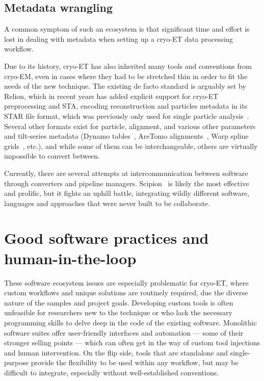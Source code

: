 \subsection{Metadata wrangling}

A common symptom of such an ecosystem is that significant time and effort is lost in dealing with metadata when setting up a cryo-ET data processing workflow.

Due to its history, cryo-ET has also inherited many tools and conventions from cryo-EM, even in cases where they had to be stretched thin in order to fit the needs of the new technique.
The existing de facto standard is arguably set by Relion, which in recent years has added explicit support for cryo-ET preprocessing and STA, encoding reconstruction and particles metadata in its STAR file format, which was previously only used for single particle analysis~\cite{zivanovBayesianApproachSingleparticle2022,burtImageProcessingPipeline2024}.
Several other formats exist for particle, alignment, and various other parameters and tilt-series metadata (Dynamo tables~\cite{castano-diezDynamoCatalogueGeometrical2017}, AreTomo alignments~\cite{zhengAreTomoIntegratedSoftware2022}, Warp spline grids~\cite{tegunovRealtimeCryoelectronMicroscopy2019}, etc.), and while some of them can be interchangeable, others are virtually impossible to convert between.

Currently, there are several attempts at intercommunication between software through converters and pipeline managers.
Scipion~\cite{delarosa-trevinScipionSoftwareFramework2016} is likely the most effective and prolific, but it fights an uphill battle, integrating wildly different software, languages and approaches that were never built to be collaborate.


\section{Good software practices and human-in-the-loop}

These software ecosystem issues are especially problematic for cryo-ET, where custom workflows and unique solutions are routinely required, due the diverse nature of the samples and project goals.
Developing custom tools is often unfeasible for researchers new to the technique or who lack the necessary programming skills to delve deep in the code of the existing software.
Monolithic software suites offer user-friendly interfaces and automation --- some of their stronger selling points --- which can often get in the way of custom tool injections and human intervention.
On the flip side, tools that are standalone and single-purpose provide the flexibility to be used within any workflow, but may be difficult to integrate, especially without well-established conventions.

